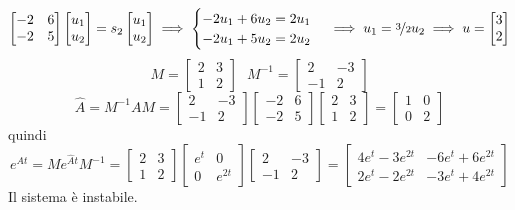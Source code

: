\documentclass[10pt, letterpaper]{report}
\begin{document}
$$
\begin{bmatrix}
    -2&6\\-2&5
\end{bmatrix}\begin{bmatrix}
    u_1\\u_2
\end{bmatrix}=s_2\begin{bmatrix}
    u_1\\u_2
\end{bmatrix}\implies \begin{cases}
    -2u_1+6u_2=2u_1\\ -2u_1+5u_2=2u_2
\end{cases}\implies 
    u_1=\nicefrac{3}{2}u_2 \implies u = \begin{bmatrix}
        3\\2
    \end{bmatrix}
$$
$$ M=\begin{bmatrix}
    2&3\\1&2
\end{bmatrix}\ \ \ M^{-1}=\begin{bmatrix}
    2&-3\\-1&2
\end{bmatrix}$$  
$$\hat A = M^{-1}AM= \begin{bmatrix}
    2&-3\\-1&2
\end{bmatrix} 
\begin{bmatrix}
    -2&6\\-2&5
\end{bmatrix}
\begin{bmatrix}
2&3\\1&2
\end{bmatrix}=\begin{bmatrix}
    1&0\\0&2
\end{bmatrix}$$
quindi 
$$ e^{At}=Me^{\hat At}M^{-1}=
\begin{bmatrix}
    2&3\\1&2
    \end{bmatrix}
    \begin{bmatrix}
        e^t&0\\0&e^{2t}
    \end{bmatrix}
\begin{bmatrix}
    2&-3\\-1&2
\end{bmatrix}= \begin{bmatrix}
    4e^t-3e^{2t}&-6e^t+6e^{2t}\\ 
    2e^t-2e^{2t} & -3e^t+4e^{2t}
\end{bmatrix} $$
Il sistema è instabile.
\end{document}
